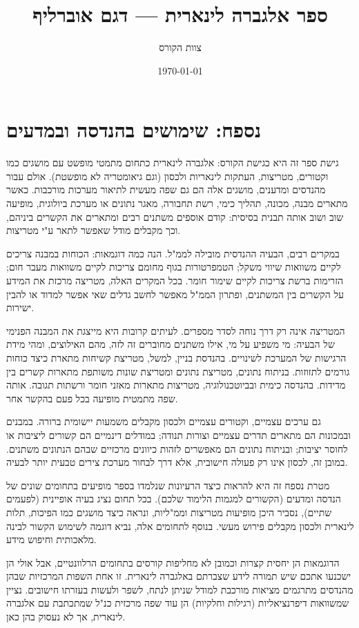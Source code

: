 \documentclass[12pt]{report}
\title{ספר אלגברה לינארית — דגם אוברליף}
\author{צוות הקורס}
\date{\today}
\theoremstyle{plain}
\theoremstyle{definition}
\newcommand{\0}{\mathbf{0}}
\begin{document}
\maketitle

\chapter{נספח: שימושים בהנדסה ובמדעים}\label{ch:appendix}

גישת ספר זה היא כגישת הקורס: אלגברה לינארית כתחום מתמטי מופשט עם מושגים כמו וקטורים, מטריצות, העתקות לינאריות ולכסון (וגם גיאומטריה לא מופשטת). אולם עבור מהנדסים ומדענים, מושגים אלה הם גם שפה מעשית לתיאור מערכות מורכבות. כאשר מתארים מבנה, מכונה, תהליך כימי, רשת תחבורה, מאגר נתונים או מערכת ביולוגית, מופיעה שוב ושוב אותה תבנית בסיסית: קודם אוספים משתנים רבים ומתארים את הקשרים ביניהם, וכך מקבלים מודל שאפשר לתאר ע"י מטריצות.

במקרים רבים, הבעיה ההנדסית מובילה לממ"ל. הנה כמה דוגמאות: הכוחות במבנה צריכים לקיים משוואות שיווי משקל; הטמפרטורות בגוף מחומם צריכות לקיים משוואות מעבר חום; הזרימות ברשת צריכות לקיים שימור חומר. בכל המקרים האלה, מטריצה מרכזת את המידע על הקשרים בין המשתנים, ופתרון הממ"ל מאפשר לחשב גדלים שאי אפשר למדוד או להבין ישירות.

המטריצה אינה רק דרך נוחה לסדר מספרים. לעיתים קרובות היא מייצגת את המבנה הפנימי של הבעיה: מי משפיע על מי, אילו משתנים מחוברים זה לזה, מהם האילוצים, ומהי מידת הרגישות של המערכת לשינויים. בהנדסת בניין, למשל, מטריצת קשיחות מתארת כיצד כוחות גורמים לתזוזות. בניתוח נתונים, מטריצת נתונים ומטריצת שונות משותפת מתארות קשרים בין מדידות. בהנדסה כימית ובביוטכנולוגיה, מטריצות מתארות מאזני חומר ורשתות תגובה. אותה שפה מתמטית מופיעה בכל פעם בהקשר אחר.

גם ערכים עצמיים, וקטורים עצמיים ולכסון מקבלים משמעות יישומית ברורה. במבנים ובמכונות הם מתארים תדרים עצמיים וצורות תנודה; במודלים דינמיים הם קשורים ליציבות או לחוסר יציבות; ובניתוח נתונים הם מאפשרים לזהות כיוונים מרכזיים שבהם הנתונים משתנים. במובן זה, לכסון אינו רק פעולה חישובית, אלא דרך לבחור מערכת צירים טבעית יותר לבעיה.

מטרת נספח זה היא להראות כיצד הרעיונות שנלמדו בספר מופיעים בתחומים שונים של הנדסה ומדעים (הקשורים למגמות הלימוד שלכם). בכל תחום נציג בעיה אופיינית (לפעמים שתיים), נסביר היכן מופיעות מטריצות וממ"ליות, ונראה כיצד מושגים כמו הפיכות, תלות לינארית ולכסון מקבלים פירוש מעשי. בנוסף לתחומים אלה, נביא דוגמה לשימוש הקשור לבינה מלאכותית וחיפוש מידע.

הדוגמאות הן יחסית קצרות וכמובן לא מחליפות קורסים בתחומים הרלוונטיים, אבל אולי הן ישכנעו אתכם שיש תמורה לידע שצברתם באלגברה לינארית. זו אחת השפות המרכזיות שבהן מהנדסים מתרגמים מציאות מורכבת למודל שניתן לנתח, לשפר ולעשות בעזרתו חישובים. נציין שמשוואות דיפרנציאליות (רגילות וחלקיות) הן עוד שפה מרכזית כנ"ל שמתכתבת עם אלגברה לינארית, אך לא נעסוק בהן כאן.
\end{document}
